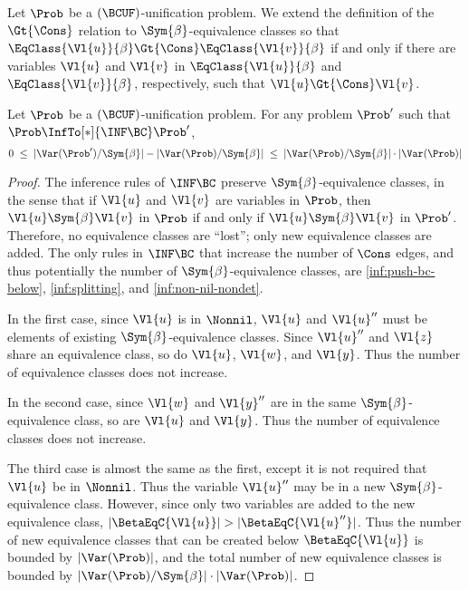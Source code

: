 \begin{Definition}
    Let $\Prob$ be a $(\BCUF)$-unification problem. We extend the definition of
    the $\Gt{\Cons}$ relation to $\Sym{\beta}$-equivalence classes so that
    $\EqClass{\Vl{u}}{\beta} \Gt{\Cons} \EqClass{\Vl{v}}{\beta}$ if and only if
    there are variables $\Vl{u}$ and $\Vl{v}$ in $\EqClass{\Vl{u}}{\beta}$ and
    $\EqClass{\Vl{v}}{\beta}$, respectively, such that $\Vl{u} \Gt{\Cons}
    \Vl{v}$.
\end{Definition}

\begin{Lemma}\label{lemma:equiv-class-bound}
    Let $\Prob$ be a $(\BCUF)$-unification problem. For any problem $\Prob'$
    such that $\Prob \InfTo[*]{\INF\BC} \Prob'$,
    \[ 0 \; \leq \;
       |\Var(\Prob') / {\Sym{\beta}}| - |\Var(\Prob) / {\Sym{\beta}}| \; \leq \;
       |\Var(\Prob) / {\Sym{\beta}}| \cdot |\Var(\Prob)| \]
\end{Lemma}

\begin{proof}
    The inference rules of $\INF\BC$ preserve $\Sym{\beta}$-equivalence classes,
    in the sense that if $\Vl{u}$ and $\Vl{v}$ are variables in $\Prob$, then
    $\Vl{u} \Sym{\beta} \Vl{v}$ in $\Prob$ if and only if $\Vl{u} \Sym{\beta}
    \Vl{v}$ in $\Prob'$. Therefore, no equivalence classes are ``lost''; only
    new equivalence classes are added.
    The only rules in $\INF\BC$ that increase the number of $\Cons$ edges, and
    thus potentially the number of $\Sym{\beta}$-equivalence classes, are
    \ref{inf:push-bc-below}, \ref{inf:splitting}, and \ref{inf:non-nil-nondet}.

    In the first case, since $\Vl{u}$ is in $\Nonnil$, $\Vl{u}$ and $\Vl{u}''$
    must be elements of existing $\Sym{\beta}$-equivalence classes. Since
    $\Vl{u}''$ and $\Vl{z}$ share an equivalence class, so do $\Vl{u}$,
    $\Vl{w}$, and $\Vl{y}$. Thus the number of equivalence classes does not
    increase.

    In the second case, since $\Vl{w}$ and $\Vl{y}''$ are in the same
    $\Sym{\beta}$-equivalence class, so are $\Vl{u}$ and $\Vl{y}$. Thus the
    number of equivalence classes does not increase.

    The third case is almost the same as the first, except it is not required
    that $\Vl{u}$ be in $\Nonnil$. Thus the variable $\Vl{u}''$ may be in a new
    $\Sym{\beta}$-equivalence class. However, since only two variables are
    added to the new equivalence class, $|\BetaEqC{\Vl{u}}| >
    |\BetaEqC{\Vl{u}''}|$. Thus the number of new equivalence classes that can
    be created below $\BetaEqC{\Vl{u}}$ is bounded by $|\Var(\Prob)|$, and the
    total number of new equivalence classes is bounded by $|\Var(\Prob) /
    {\Sym{\beta}}| \cdot |\Var(\Prob)|$.
\end{proof}

